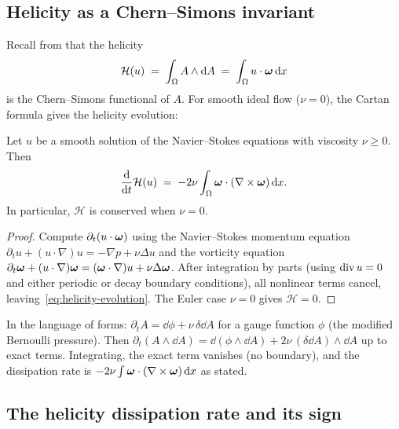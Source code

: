 \subsection{Helicity as a Chern--Simons invariant}\label{sec:det-helicity-cs}

Recall from  that the helicity
\begin{equation}\label{eq:det-helicity}
  \mathcal{H}(u) \;=\; \int_\Omega A\wedge \mathrm{d} A
  \;=\; \int_\Omega u\cdot\boldsymbol{\omega}\,\mathrm{d} x
\end{equation}
is the Chern--Simons functional of $A$.  For smooth ideal flow
($\nu = 0$), the Cartan formula gives the helicity evolution:

\begin{proposition}\label{prop:helicity-evolution}
  Let $u$ be a smooth solution of the Navier--Stokes equations with viscosity
  $\nu \geq 0$.  Then
  \begin{equation}\label{eq:helicity-evolution}
    \frac{\mathrm{d}}{\mathrm{d} t}\mathcal{H}(u)
    \;=\; -2\nu\int_\Omega \boldsymbol{\omega}\cdot(\nabla\times\boldsymbol{\omega})\,\mathrm{d} x.
  \end{equation}
  In particular, $\mathcal{H}$ is conserved when $\nu = 0$.
\end{proposition}

\begin{proof}
  Compute $\partial_t(u\cdot\boldsymbol{\omega})$ using the Navier--Stokes momentum equation
  $\partial_t u + (u\cdot\nabla)u = -\nabla p + \nu\Delta u$ and the vorticity
  equation $\partial_t\boldsymbol{\omega} + (u\cdot\nabla)\boldsymbol{\omega} = (\boldsymbol{\omega}\cdot\nabla)u + \nu\Delta\boldsymbol{\omega}$.
  After integration by parts (using $\operatorname{div} u = 0$ and either periodic or
  decay boundary conditions), all nonlinear terms cancel, leaving~\eqref{eq:helicity-evolution}.
  The Euler case $\nu = 0$ gives $\dot{\mathcal{H}} = 0$.
\end{proof}

\begin{remark}\label{rem:cartan-helicity}
  In the language of forms: $\partial_t A = \dd\phi + \nu\,\delta\dd A$ for a
  gauge function $\phi$ (the modified Bernoulli pressure).  Then
  $\partial_t(A\wedge\dd A) = \dd(\phi\wedge\dd A) + 2\nu\,(\delta\dd A)\wedge\dd A$
  up to exact terms.  Integrating, the exact term vanishes (no boundary), and
  the dissipation rate is $-2\nu\int\boldsymbol{\omega}\cdot(\nabla\times\boldsymbol{\omega})\,\mathrm{d} x$
  as stated.
\end{remark}

\subsection{The helicity dissipation rate and its sign}\label{sec:det-helicity-dissip}

